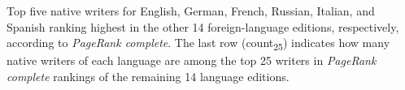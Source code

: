 \documentclass[a4paper,12pt]{scrartcl}
\begin{document}
\begin{table}
{\begin{tabular}{@{}llll@{}}
     
    \bottomrule
  \end{tabular}
  } 
  \begin{flushleft}
    Top five native writers for English, German, French, Russian,
    Italian, and Spanish ranking highest in the other 14
    foreign-language editions, respectively, according to
    \emph{PageRank complete}. The last row (count\textsubscript{25})
    indicates how many native writers of each language are among the
    top 25 writers in \emph{PageRank complete} rankings of the remaining
    14 language editions.
  \end{flushleft}
\end{table}
\end{document}
